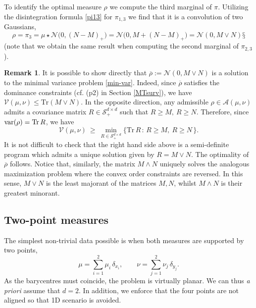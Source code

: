 \documentclass[11pt,letterpaper,reqno]{amsart}
\theoremstyle{definition}
\newtheorem{remark}[theorem]{Remark}
\numberwithin{equation}{section}
\newcommand{\ov}{\overline}
\newcommand{\A}{\mathcal{A}}
\newcommand{\var}{{\rm{var}}}
\newcommand{\Sddp}{{\mathcal{S}^{d\times d}_+}}
\newcommand{\tr}{{\mathrm{Tr}}}
\newcommand{\V}{{\mathcal{V}}}
\begin{document}
{To identify the optimal measure $\rho$ we compute the third marginal of $\pi$. 
Utilizing the disintegration formula \eqref{pi13} for $\pi_{1,3}$ we find that it is a convolution of two Gaussians,
\begin{equation*}
	\rho = \pi_3 = \mu \star \mathcal{N}\big(0,(N-M)_+\big) =  \mathcal{N} \big(0,M+(N-M)_+\big) = \mathcal{N} (0,M \vee N)
§\end{equation*}
(note that we obtain the same result  when computing the second marginal of $\pi_{2,3}$).

\begin{remark}\label{wedge-vee}
	It is possible to show directly that  $\ov \rho:=\mathcal{N} (0,M \vee N)$  is a solution to the minimal variance problem \eqref{min-var}. Indeed, since $\ov \rho$ satisfies the dominance constraints (cf. (p2) in Section \ref{MTsurv}), we have $\V(\mu,\nu) \le \tr(M\vee N)$.
In the opposite direction, any admissible $\rho\in \A(\mu,\nu)$ admits a covariance matrix $R\in \Sddp$ such that  $R \geq M, \ R \geq N$. Therefore, since $\var(\rho) = \tr\, R$, we have
	 \begin{equation*}
	\V(\mu,\nu) \ \ge \ 	\min_{R \in \Sddp} \Big\{ \tr \, R \, : \, R \geq M, \ R \geq N \,\Big\}.
	\end{equation*}
It is not difficult to check that the right hand side above is  a semi-definite program	which admits a unique solution given by $R= M \vee N$. The optimality of $\ov \rho$ follows.
 Notice that, similarly, the matrix $M \wedge N$ uniquely solves the analogous maximization problem where the convex order constraints are reversed. In this sense, $M \vee N$ is the least majorant of the matrices $M,N$, whilst $M\wedge N$ is their greatest minorant.
\end{remark}



\subsection{Two-point measures }
\label{ex:2vs2}

The simplest non-trivial data possible is when both measures are supported by two points,
\begin{equation*}
	\mu = \sum_{i=1}^2 \mu_i \,\delta_{x_i}, \qquad \nu = \sum_{j=1}^2 \nu_j \,\delta_{y_j}.
\end{equation*}
As the barycentres must coincide, the problem is virtually planar. We can thus \textit{a priori} assume that $d = 2$. In addition, we enforce that the four points are not aligned so that 1D scenario is avoided.

}
\end{document}
